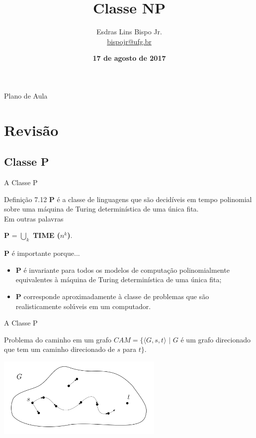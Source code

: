 \documentclass[xcolor=dvipsnames,table]{beamer}
\title{Classe NP}
\author{
  Esdras Lins Bispo Jr. \\ \url{bispojr@ufg.br}
  }
\institute{
  Teoria da Computação \\Bacharelado em Ciência da Computação}
\date{\textbf{17 de agosto de 2017} }
\begin{document}
	\begin{frame}
		\titlepage
	\end{frame}

	\AtBeginSection{
		\begin{frame}{Sumário}%
    		\tableofcontents[currentsection]
		\end{frame}
	}

	\begin{frame}{Plano de Aula}
		\tableofcontents
	\end{frame}
    
    \section{Revisão}
	\subsection{Classe P}
	
	\begin{frame}{A Classe P}
		\begin{block}{Definição 7.12}
			{\bf P} é a classe de linguagens que são decidíveis em tempo polinomial sobre uma máquina de Turing determinística de uma única fita. \\Em outras palavras
			\begin{center}
				{\bf P} = $\bigcup\limits_{k}$ {\bf TIME ($n^k$)}.
			\end{center}
		\end{block}   
		\begin{block}{{\bf P} é importante porque...}   
			\begin{itemize} 
				\item {\bf P} é invariante para todos os modelos de computação polinomialmente equivalentes à máquina de Turing determinística de uma única fita;   
				\item {\bf P} corresponde aproximadamente à classe de problemas que são realisticamente solúveis em um computador.
			\end{itemize}
		\end{block}
	\end{frame}
	
	\begin{frame}{A Classe P}
		\begin{block}{Problema do caminho em um grafo}
			$CAM = \{ \langle G, s, t \rangle \mbox{ | } G$ é um grafo direcionado que tem um caminho direcionado de $s$ para $t \}$.
		\end{block}   
		\begin{center}
			\includegraphics[width=8cm]{images/cam.png}
		\end{center}
	\end{frame}
	
\end{document}
